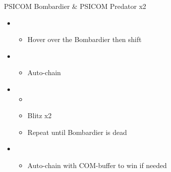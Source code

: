\documentclass{report}
\begin{document}
\begin{battle}{PSICOM Bombardier \& PSICOM Predator x2}
\begin{itemize}
    \item \first
    \begin{itemize}
        \item Hover over the Bombardier then shift
    \end{itemize}
    \item \second
    \begin{itemize}
        \item Auto-chain
    \end{itemize}
    \item \first
    \begin{itemize}
        \item \stagger
        \item Blitz x2
        \item Repeat until Bombardier is dead
    \end{itemize}
    \item \second
    \begin{itemize}
        \item Auto-chain with COM-buffer to win if needed
    \end{itemize}
\end{itemize}
 
\end{battle}

\end{document}
